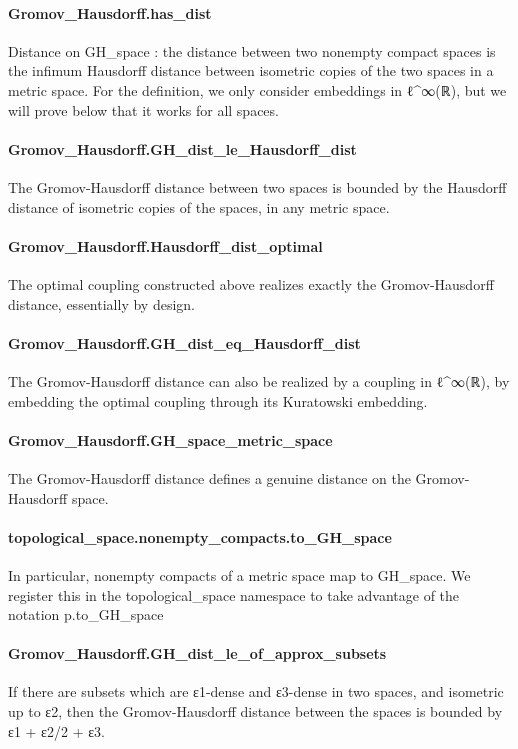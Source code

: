 \documentclass{article}
\begin{document}
\paragraph{Gromov\_Hausdorff.has\_dist}
\par
Distance on GH\_space : the distance between two nonempty compact spaces is the infimum
Hausdorff distance between isometric copies of the two spaces in a metric space. For the definition,
we only consider embeddings in ℓ\textasciicircum{}∞(ℝ), but we will prove below that it works for all spaces.
\paragraph{Gromov\_Hausdorff.GH\_dist\_le\_Hausdorff\_dist}
\par
The Gromov-Hausdorff distance between two spaces is bounded by the Hausdorff distance
of isometric copies of the spaces, in any metric space.
\paragraph{Gromov\_Hausdorff.Hausdorff\_dist\_optimal}
\par
The optimal coupling constructed above realizes exactly the Gromov-Hausdorff distance,
essentially by design.
\paragraph{Gromov\_Hausdorff.GH\_dist\_eq\_Hausdorff\_dist}
\par
The Gromov-Hausdorff distance can also be realized by a coupling in ℓ\textasciicircum{}∞(ℝ), by embedding
the optimal coupling through its Kuratowski embedding.
\paragraph{Gromov\_Hausdorff.GH\_space\_metric\_space}
\par
The Gromov-Hausdorff distance defines a genuine distance on the Gromov-Hausdorff space.
\paragraph{topological\_space.nonempty\_compacts.to\_GH\_space}
\par
In particular, nonempty compacts of a metric space map to GH\_space. We register this
in the topological\_space namespace to take advantage of the notation p.to\_GH\_space
\paragraph{Gromov\_Hausdorff.GH\_dist\_le\_of\_approx\_subsets}
\par
If there are subsets which are ε1-dense and ε3-dense in two spaces, and
isometric up to ε2, then the Gromov-Hausdorff distance between the spaces is bounded by
ε1 + ε2/2 + ε3.
\end{document}
